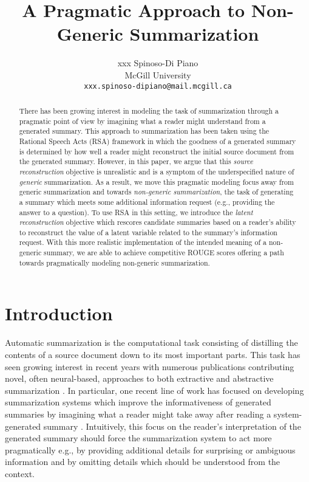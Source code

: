 \documentclass[11pt]{article}
\title{A Pragmatic Approach to Non-Generic Summarization}
\author{
xxx Spinoso-Di Piano \\
McGill University \\
\texttt{xxx.spinoso-dipiano@mail.mcgill.ca}
}
\begin{document}
\maketitle

\begin{abstract}
    There has been growing interest in modeling the task of summarization through a pragmatic point of view by imagining what a reader might understand from a generated summary. This approach to summarization has been taken using the Rational Speech Acts (RSA) framework in which the goodness of a generated summary is determined by how well a reader might reconstruct the initial source document from the generated summary. However, in this paper, we argue that this \emph{source reconstruction} objective is unrealistic and is a symptom of the underspecified nature of \emph{generic} summarization. As a result, we move this pragmatic modeling focus away from generic summarization and towards \emph{non-generic summarization}, the task of generating a summary which meets some additional information request (e.g., providing the answer to a question). To use RSA in this setting, we introduce the \emph{latent reconstruction} objective which rescores candidate summaries based on a reader's ability to reconstruct the value of a latent variable related to the summary's information request. With this more realistic implementation of the intended meaning of a non-generic summary, we are able to achieve competitive ROUGE scores offering a path towards pragmatically modeling non-generic summarization.
\end{abstract}


\section{Introduction}

Automatic summarization is the computational task consisting of distilling the contents of a source document down to its most important parts. This task has seen growing interest in recent years with numerous publications contributing novel, often neural-based, approaches to both extractive and abstractive summarization \citep{rush-etal-2015-neural,nallapati-etal-2016-abstractive,see-etal-2017-get}. In particular, one recent line of work has focused on developing summarization systems which improve the informativeness of generated summaries by imagining what a reader might take away after reading a system-generated summary \citep{shen-etal-2019-pragmatically}. Intuitively, this focus on the reader's interpretation of the generated summary should force the summarization system to act more pragmatically e.g., by providing additional details for surprising or ambiguous information and by omitting details which should be understood from the context.
\end{document}
